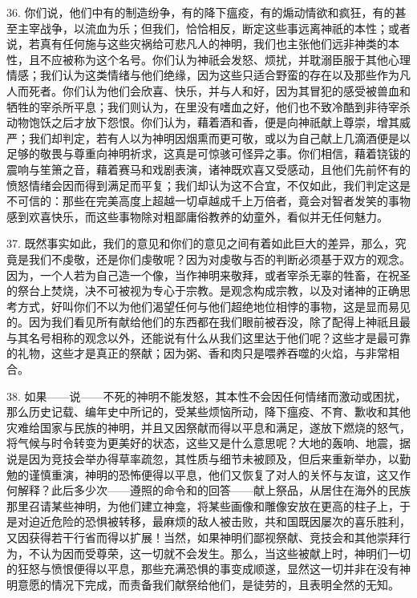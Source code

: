 36. 你们说，他们中有的制造纷争，有的降下瘟疫，有的煽动情欲和疯狂，有的甚至主宰战争，以流血为乐；但我们，恰恰相反，断定这些事远离神祇的本性；或者说，若真有任何施与这些灾祸给可悲凡人的神明，我们也主张他们远非神类的本性，且不应被称为这个名号。你们认为神祇会发怒、烦扰，并耽溺臣服于其他心理情感；我们认为这类情绪与他们绝缘，因为这些只适合野蛮的存在以及那些作为凡人而死者。你们认为他们会欣喜、快乐，并与人和好，因为其冒犯的感受被兽血和牺牲的宰杀所平息；我们则认为，在里没有嗜血之好，他们也不致冷酷到非待宰杀动物饱饫之后才放下怨恨。你们认为，藉着酒和香，便是向神祇献上尊崇，增其威严；我们却判定，若有人以为神明因烟熏而更可敬，或以为自己献上几滴酒便是以足够的敬畏与尊重向神明祈求，这真是可惊骇可怪异之事。你们相信，藉着铙钹的震响与笙箫之音，藉着赛马和戏剧表演，诸神既欢喜又受感动，且他们先前怀有的愤怒情绪会因而得到满足而平复；我们却认为这不合宜，不仅如此，我们判定这是不可信的：那些在完美高度上超越一切卓越成千上万倍者，竟会对智者发笑的事物感到欢喜快乐，而这些事物除对粗鄙庸俗教养的幼童外，看似并无任何魅力。\par

37. 既然事实如此，我们的意见和你们的意见之间有着如此巨大的差异，那么，究竟是我们不虔敬，还是你们虔敬呢？因为对虔敬与否的判断必须基于双方的观念。因为，一个人若为自己造一个像，当作神明来敬拜，或者宰杀无辜的牲畜，在祝圣的祭台上焚烧，决不可被视为专心于宗教。是观念构成宗教，以及对诸神的正确思考方式，好叫你们不以为他们渴望任何与他们超绝地位相悖的事物，这是显而易见的。因为我们看见所有献给他们的东西都在我们眼前被吞没，除了配得上神祇且最与其名号相称的观念以外，还能说有什么从我们这里达于他们呢？这些才是最可靠的礼物，这些才是真正的祭献；因为粥、香和肉只是喂养吞噬的火焰，与非常相合。\par

38. 如果——说——不死的神明不能发怒，其本性不会因任何情绪而激动或困扰，那么历史记载、编年史中所记的，受某些烦恼所动，降下瘟疫、不育、歉收和其他灾难给国家与民族的神明，并且又因祭献而得以平息和满足，遂放下燃烧的怒气，将气候与时令转变为更美好的状态，这些又是什么意思呢？大地的轰响、地震，据说是因为竞技会举办得草率疏忽，其性质与细节未被顾及，但后来重新举办，以勤勉的谨慎重演，神明的恐怖便得以平息，他们又恢复了对人的关怀与友谊，这又作何解释？此后多少次——遵照的命令和的回答——献上祭品，从居住在海外的民族那里召请某些神明，为他们建立神龛，将某些画像和雕像安放在更高的柱子上，于是对迫近危险的恐惧被转移，最麻烦的敌人被击败，共和国既因屡次的喜乐胜利，又因获得若干行省而得以扩展！当然，如果神明们鄙视祭献、竞技会和其他崇拜行为，不认为因而受尊荣，这一切就不会发生。那么，当这些被献上时，神明们一切的狂怒与愤恨便得以平息，那些充满恐惧的事变成顺遂，显然这一切并非在没有神明意愿的情况下完成，而责备我们献祭给他们，是徒劳的，且表明全然的无知。\par

